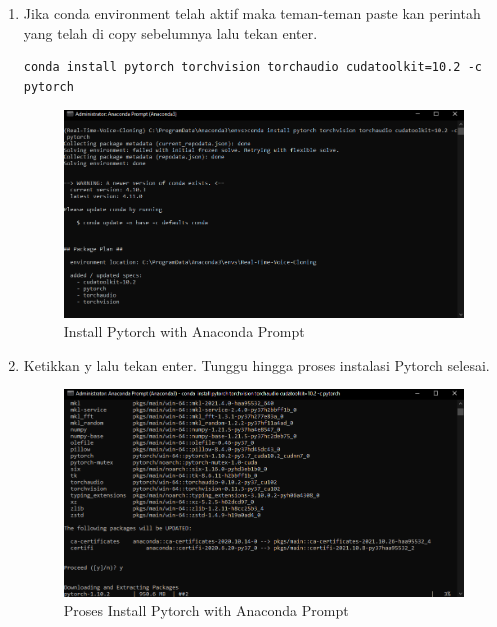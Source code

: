 \begin{enumerate}
\item Jika conda environment telah aktif maka teman-teman paste kan perintah yang telah di copy sebelumnya lalu tekan enter.
\begin{lstlisting}
conda install pytorch torchvision torchaudio cudatoolkit=10.2 -c pytorch
\end{lstlisting}
\begin{figure}[H]
\centering
\includegraphics[scale=.35]{figures/pytorch9}
\caption{Install Pytorch with Anaconda Prompt}
\label{pytorch9}
\end{figure}

\item Ketikkan y lalu tekan enter. Tunggu hingga proses instalasi Pytorch selesai.
\begin{figure}[H]
\centering
\includegraphics[scale=.35]{figures/pytorch8}
\caption{Proses Install Pytorch with Anaconda Prompt}
\label{pytorch8}
\end{figure}


\end{enumerate}
